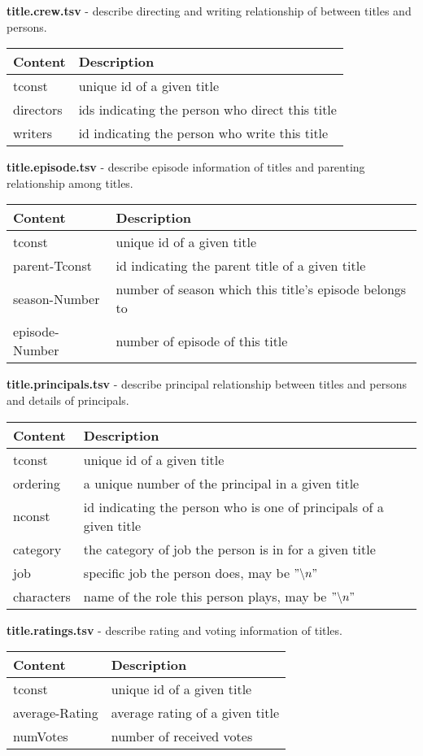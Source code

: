 \documentclass[a4paper]{article}
\begin{document}
\noindent
\textbf{title.crew.tsv} - describe directing and writing relationship of between titles and persons.
\begin{longtable}[l]{p{2.5cm}|p{10.5cm}}
\hline
Content & Description \\ \hline
tconst & unique id of a given title \\ \hline
directors & ids indicating the person who direct this title \\ \hline
writers & id indicating the person who write this title \\ \hline
\end{longtable}
\noindent
\textbf{title.episode.tsv} - describe episode information of titles and parenting relationship among titles.
\begin{longtable}[l]{p{2.5cm}|p{10.5cm}}
\hline
Content & Description \\ \hline
tconst & unique id of a given title \\ \hline
parent-Tconst & id indicating the parent title of a given title \\ \hline
season-Number & number of season which this title's episode belongs to \\ \hline
episode-Number & number of episode of this title \\ \hline
\end{longtable}
\noindent
\textbf{title.principals.tsv} - describe principal relationship between titles and persons and details of principals.
\begin{longtable}[l]{p{2.5cm}|p{10.5cm}}
\hline
Content & Description \\ \hline
tconst & unique id of a given title \\ \hline
ordering & a unique number of the principal in a given title \\ \hline
nconst & id indicating the person who is one of principals of a given title \\ \hline
category & the category of job the person is in for a given title \\ \hline
job & specific job the person does, may be $"\backslash n"$ \\ \hline
characters & name of the role this person plays, may be $"\backslash n"$ \\ \hline
\end{longtable}
\noindent
\textbf{title.ratings.tsv} - describe rating and voting information of titles.
\begin{longtable}[l]{p{2.5cm}|p{10.5cm}}
\hline
Content & Description \\ \hline
tconst & unique id of a given title \\ \hline
average-Rating & average rating of a given title \\ \hline
numVotes & number of received votes \\ \hline
\end{longtable}
\end{document}
